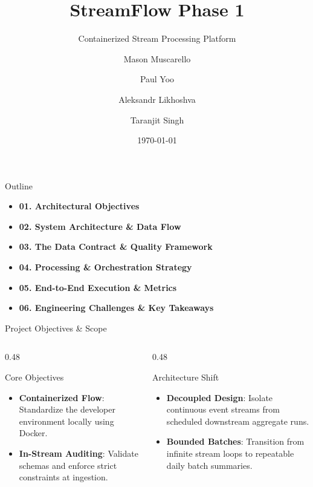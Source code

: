 \documentclass[10pt]{beamer}
\title{StreamFlow Phase 1}
\subtitle{Containerized Stream Processing Platform}
\author{Mason Muscarello \and Paul Yoo \and Aleksandr Likhoshva \and Taranjit Singh}
\institute{Revature}
\date{\today}
\begin{document}
\maketitle

\begin{frame}{Outline}
  \begin{itemize}
    \item \textbf{01. Architectural Objectives}
    \item \textbf{02. System Architecture \& Data Flow}
    \item \textbf{03. The Data Contract \& Quality Framework}
    \item \textbf{04. Processing \& Orchestration Strategy}
    \item \textbf{05. End-to-End Execution \& Metrics}
    \item \textbf{06. Engineering Challenges \& Key Takeaways}
  \end{itemize}
\end{frame}

\begin{frame}{Project Objectives \& Scope}
  \begin{columns}[T]
    \begin{column}{0.48\textwidth}
      \begin{block}{Core Objectives}
        \begin{itemize}
          \item \textbf{Containerized Flow}: Standardize the developer environment locally using Docker.
          \item \textbf{In-Stream Auditing}: Validate schemas and enforce strict constraints at ingestion.
        \end{itemize}
      \end{block}
    \end{column}
    
    \hfill
    
    \begin{column}{0.48\textwidth}
      \begin{block}{Architecture Shift}
        \begin{itemize}
          \item \textbf{Decoupled Design}: Isolate continuous event streams from scheduled downstream aggregate runs.
          \item \textbf{Bounded Batches}: Transition from infinite stream loops to repeatable daily batch summaries.
        \end{itemize}
      \end{block}
    \end{column}
  \end{columns}
\end{frame}
\end{document}
